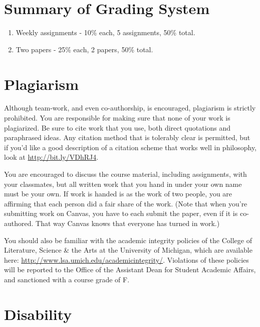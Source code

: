 \documentclass[
]{article}
\providecommand{\tightlist}{%
  \setlength{\itemsep}{0pt}\setlength{\parskip}{0pt}}
\begin{document}
\hypertarget{summary-of-grading-system}{%
\section{Summary of Grading System}\label{summary-of-grading-system}}

\begin{enumerate}
\def\labelenumi{\arabic{enumi}.}
\tightlist
\item
  Weekly assignments - 10\% each, 5 assignments, 50\% total.
\item
  Two papers - 25\% each, 2 papers, 50\% total.
\end{enumerate}

\newpage

\hypertarget{plagiarism}{%
\section{Plagiarism}\label{plagiarism}}

Although team-work, and even co-authorship, is encouraged, plagiarism is
strictly prohibited. You are responsible for making sure that none of
your work is plagiarized. Be sure to cite work that you use, both direct
quotations and paraphrased ideas. Any citation method that is tolerably
clear is permitted, but if you'd like a good description of a citation
scheme that works well in philosophy, look at
\url{http://bit.ly/VDhRJ4}.

You are encouraged to discuss the course material, including
assignments, with your classmates, but all written work that you hand in
under your own name must be your own. If work is handed is as the work
of two people, you are affirming that each person did a fair share of
the work. (Note that when you're submitting work on Canvas, you have to
each submit the paper, even if it is co-authored. That way Canvas knows
that everyone has turned in work.)

You should also be familiar with the academic integrity policies of the
College of Literature, Science \& the Arts at the University of
Michigan, which are available here:
\url{http://www.lsa.umich.edu/academicintegrity/}. Violations of these
policies will be reported to the Office of the Assistant Dean for
Student Academic Affairs, and sanctioned with a course grade of F.

\hypertarget{disability}{%
\section{Disability}\label{disability}}
\end{document}
